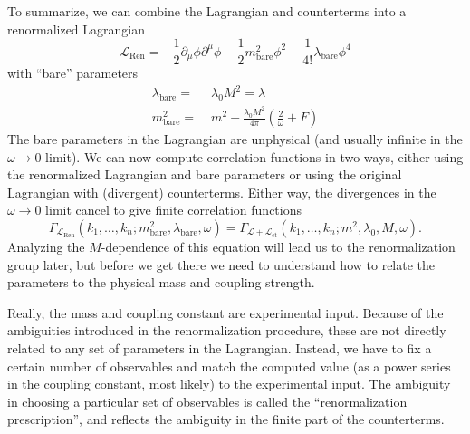 To summarize, we can combine the Lagrangian and counterterms into a
renormalized Lagrangian
\begin{equation}
  \mathcal{L}_\text{Ren} = 
  -\frac{1}{2} \partial_\mu \phi \partial^\mu \phi
  -\frac{1}{2} m_\text{bare}^2 \phi^2 
  - \frac{1}{4!} \lambda_\text{bare} \phi^4
\end{equation}
with ``bare'' parameters
\begin{equation}
  \begin{split}
    \lambda_\text{bare} =&\; \lambda_0 M^2 = \lambda \\
    m_\text{bare}^2 =&\; 
    m^2 - \frac{\lambda_0 M^2}{4\pi} \left( \frac{2}{\omega} + F\right)
  \end{split}
\end{equation}
The bare parameters in the Lagrangian are unphysical (and usually
infinite in the $\omega\to 0$ limit). We can now compute correlation
functions in two ways, either using the renormalized Lagrangian and
bare parameters or using the original Lagrangian with (divergent)
counterterms. Either way, the divergences in the $\omega\to 0$ limit
cancel to give finite correlation functions
\begin{equation}
  \Gamma_{\mathcal{L}_\text{Ren}}
  (k_1, \dots, k_n; m_\text{bare}^2, \lambda_\text{bare}, \omega) = 
  \Gamma_{\mathcal{L}+\mathcal{L}_\text{ct}}
  (k_1, \dots, k_n; m^2, \lambda_0, M, \omega).
\end{equation}
Analyzing the $M$-dependence of this equation will lead us to the
renormalization group later, but before we get there we need to
understand how to relate the parameters to the physical mass and
coupling strength.

Really, the mass and coupling constant are experimental input. Because
of the ambiguities introduced in the renormalization procedure, these
are not directly related to any set of parameters in the
Lagrangian. Instead, we have to fix a certain number of observables
and match the computed value (as a power series in the coupling
constant, most likely) to the experimental input. The ambiguity in
choosing a particular set of observables is called the
``renormalization prescription'', and reflects the ambiguity in the
finite part of the counterterms.

